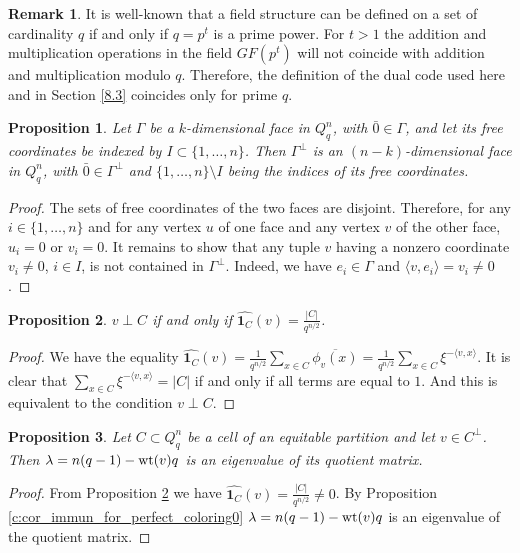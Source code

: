 \documentclass[11pt]{article}
\newtheorem{claim}{Proposition}[section]
\theoremstyle{definition}
\newtheorem{remark}{Remark}[section]
\newcommand{\wt}{{\rm wt}}
\begin{document}
{{{\begin{remark}
It is well-known that a field structure can be defined on a set of cardinality $q$ if and only if
$q=p^t$
is a prime power. For $t>1$ the addition and multiplication operations in the field $GF(p^t)$
will
not coincide with addition and multiplication modulo $q$.
Therefore, the definition of the dual code used here and in Section \ref{8.3}  coincides
only for prime $q$.
\end{remark}





\begin{claim}
Let $\Gamma$ be a $k$-dimensional face in $Q^n_q$, with $\bar{0}\in
\Gamma$, and let its free coordinates be indexed by  $I\subset \{1,\dots,n\}$. Then $\Gamma^{\perp}$ is an $(n-k)$-dimensional face in
$Q^n_q$, with $\bar{0}\in \Gamma^{\perp}$ and
$\{1,\dots,n\}\setminus I$
being the indices of its free coordinates.
\end{claim}
\begin{proof}
The sets of free coordinates of the two faces are disjoint. Therefore,
for any $i\in\{1,\dots,n\}$ and for any vertex $u$ of one face and  any vertex $v$
of the other face, $u_i=0$ or $v_i=0$. It remains to show that any tuple
$v$ having a nonzero coordinate $v_i\neq 0$, $i\in I$, is not
contained in $\Gamma^{\perp}$. Indeed, we have $e_i\in \Gamma$
and $\langle v,e_i\rangle=v_i\neq 0$.
\end{proof}

\begin{claim}\label{c:dual}
$v\perp C$ if and only if $\widehat{{\mathbf 1}_{C}}(v)=\frac{|C|}{q^{n/2}}$.
\end{claim}
\begin{proof}
We have the equality
$\widehat{{\mathbf 1}_{C}}(v)=\frac{1}{q^{n/2}}\sum\limits_{x\in
    C}\overline{\phi_v(x)}= \frac{1}{q^{n/2}}\sum\limits_{x\in
    C}\xi^{-\langle v, x\rangle}$. It is clear that $\sum\limits_{x\in
    C}\xi^{-\langle v, x\rangle}=|C|$
if and only if all terms are equal to $1$. And this is equivalent to
the condition $v\perp C$.
\end{proof}

\begin{claim}\label{cor:dualcode}
Let $C\subset Q_q^n$ be a cell of an equitable partition and let $v\in C^\perp$. Then $\lambda=n(q-1)-\wt(v)q$ is an eigenvalue of its quotient  matrix.
\end{claim}
\begin{proof}
From Proposition \ref{c:dual} we have $\widehat{{\mathbf 1}_{C}}(v)=\frac{|C|}{q^{n/2}}\neq 0$. By Proposition \ref{c:cor_immun_for_perfect_coloring0}  $\lambda=n(q-1)-\wt(v)q$ is an eigenvalue of the   quotient  matrix.
\end{proof}

}}}
\end{document}
